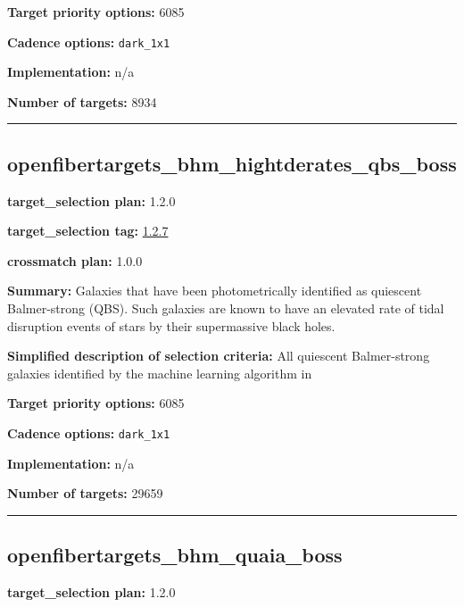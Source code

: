 \noindent\textbf{Target priority options:} 6085

\noindent\textbf{Cadence options:} \texttt{dark\_1x1}

\noindent\textbf{Implementation:} n/a

\noindent\textbf{Number of targets:} 8934

\begin{center}\rule{0.5\linewidth}{0.5pt}\end{center}

\hypertarget{openfibertargets_bhm_hightderates_qbs_boss_plan1.2.0}{%
\subsection{openfibertargets\_bhm\_hightderates\_qbs\_boss}\label{openfibertargets_bhm_hightderates_qbs_boss_plan1.2.0}}

\noindent\textbf{target\_selection plan:} 1.2.0

\noindent\textbf{target\_selection tag:}
\href{https://github.com/sdss/target_selection/tree/1.2.7/}{1.2.7}

\noindent\textbf{crossmatch plan:} 1.0.0

\noindent\textbf{Summary:} Galaxies that have been photometrically identified as
quiescent Balmer-strong (QBS). Such galaxies are known to have an
elevated rate of tidal disruption events of stars by their supermassive
black holes.

\noindent\textbf{Simplified description of selection criteria:} All quiescent
Balmer-strong galaxies identified by the machine learning algorithm in
\citealt{French2018}


\noindent\textbf{Target priority options:} 6085

\noindent\textbf{Cadence options:} \texttt{dark\_1x1}

\noindent\textbf{Implementation:} n/a

\noindent\textbf{Number of targets:} 29659

\begin{center}\rule{0.5\linewidth}{0.5pt}\end{center}

\hypertarget{openfibertargets_bhm_quaia_boss_plan1.2.0}{%
\subsection{openfibertargets\_bhm\_quaia\_boss}\label{openfibertargets_bhm_quaia_boss_plan1.2.0}}

\noindent\textbf{target\_selection plan:} 1.2.0

